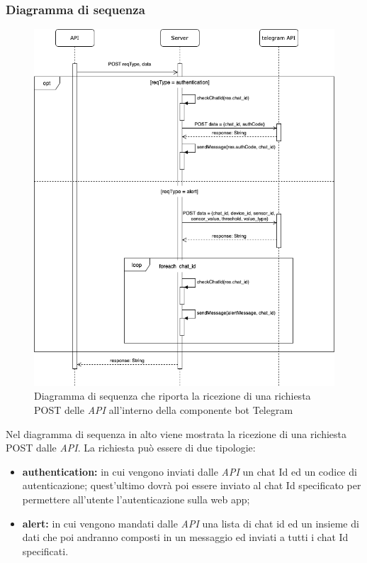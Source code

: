 \subsubsection{Diagramma di sequenza}%
	\begin{figure}[H]
		\centering
		\includegraphics[scale=0.500]{res/images/BOTTELEGRAM/TelegramRichiestaPOST.png}
		\caption{Diagramma di sequenza che riporta la ricezione di una richiesta POST delle \textit{API} all'interno della componente bot Telegram}
		\label{Diagramma 20}
	\end{figure}

	Nel diagramma di sequenza in alto viene mostrata la ricezione di una richiesta POST dalle \textit{API}. La richiesta può essere di due tipologie: 
	\begin{itemize}
		\item \textbf{authentication:} in cui vengono inviati dalle \textit{API} un chat Id ed un codice di autenticazione; quest'ultimo dovrà poi essere inviato al chat Id specificato per permettere all'utente l'autenticazione sulla web app;
		\item \textbf{alert:} in cui vengono mandati dalle \textit{API} una lista di chat id ed un insieme di dati che poi andranno composti in un messaggio ed inviati a tutti i chat Id specificati.
	\end{itemize}
